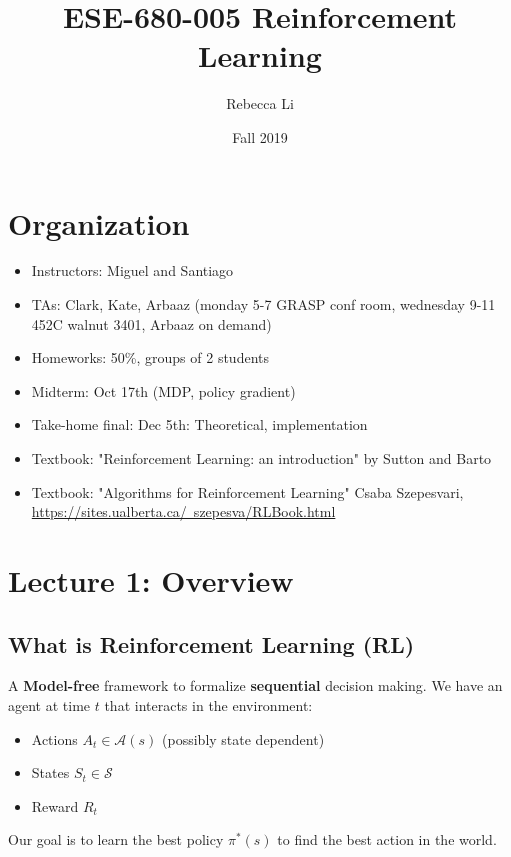 \documentclass{article}
\title{ESE-680-005 Reinforcement Learning}
\author{Rebecca Li}
\date{Fall 2019}
\begin{document}
	\maketitle

\section{Organization}
\begin{itemize}
	\item Instructors: Miguel and Santiago 
	\item TAs: Clark, Kate, Arbaaz (monday 5-7 GRASP conf room, wednesday 9-11 452C walnut 3401, Arbaaz on demand)
	\item Homeworks: 50\%, groups of 2 students
	\item Midterm: Oct 17th (MDP, policy gradient)
	\item Take-home final: Dec 5th: Theoretical, implementation
	\item Textbook: "Reinforcement Learning: an introduction" by Sutton and Barto
	\item Textbook: "Algorithms for Reinforcement Learning" Csaba Szepesvari, \\
		\href{https://sites.ualberta.ca/~szepesva/RLBook.html}{https://sites.ualberta.ca/~szepesva/RLBook.html}
\end{itemize}	
\section{Lecture 1: Overview}
\subsection{What is Reinforcement Learning (RL)}
A \textbf{Model-free} framework to formalize \textbf{sequential} decision making. We have an agent at time $t$ that interacts in the environment:
\begin{itemize}
	\item Actions $A_t \in \mathcal{A}(s)$  (possibly state dependent)
	\item States $S_t \in \mathcal{S}$
	\item Reward $R_t$
\end{itemize}

Our goal is to learn the best policy $\pi^*(s)$ to find the best action in the world. 
\end{document}
